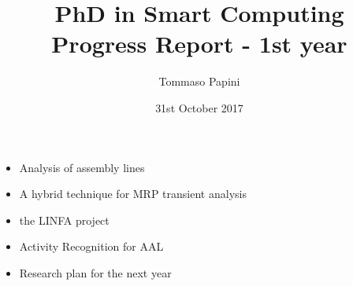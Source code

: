 
\title[PhD in Smart Computing - Progress Report - 1st year]{
  PhD in Smart Computing\\
  Progress Report - 1st year
}
\author{
  Tommaso Papini
}
\date{
  31st October 2017
}
  
\begin{frame}
  \titlepage
  
  \begin{itemize}
    \item Analysis of assembly lines
    \item A hybrid technique for MRP transient analysis
    \item the LINFA project
    \item Activity Recognition for AAL
    \item Research plan for the next year
  \end{itemize}
\end{frame}